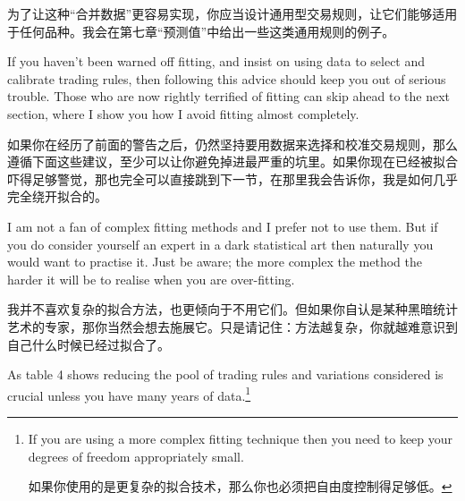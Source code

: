 \begin{chineseblock}为了让这种“合并数据”更容易实现，你应当设计通用型交易规则，让它们能够适用于任何品种。我会在第七章“预测值”中给出一些这类通用规则的例子。\end{chineseblock}


\begin{englishblock} If you haven't been warned off fitting, and insist on using data to select and calibrate trading rules, then following this advice should keep you out of serious trouble. Those who are now rightly terrified of fitting can skip ahead to the next section, where I show you how I avoid fitting almost completely. \end{englishblock}

\begin{chineseblock}如果你在经历了前面的警告之后，仍然坚持要用数据来选择和校准交易规则，那么遵循下面这些建议，至少可以让你避免掉进最严重的坑里。如果你现在已经被拟合吓得足够警觉，那也完全可以直接跳到下一节，在那里我会告诉你，我是如何几乎完全绕开拟合的。\end{chineseblock}


\begin{englishblock} I am not a fan of complex fitting methods and I prefer not to use them. But if you do consider yourself an expert in a dark statistical art then naturally you would want to practise it. Just be aware; the more complex the method the harder it will be to realise when you are over-fitting. \end{englishblock}

\begin{chineseblock}我并不喜欢复杂的拟合方法，也更倾向于不用它们。但如果你自认是某种黑暗统计艺术的专家，那你当然会想去施展它。只是请记住：方法越复杂，你就越难意识到自己什么时候已经过拟合了。\end{chineseblock}


\begin{englishblock} As table 4 shows reducing the pool of trading rules and variations considered is crucial unless you have many years of data.\footnote{If you are using a more complex fitting technique then you need to keep your degrees of freedom appropriately small. \par 如果你使用的是更复杂的拟合技术，那么你也必须把自由度控制得足够低。}\end{englishblock}

